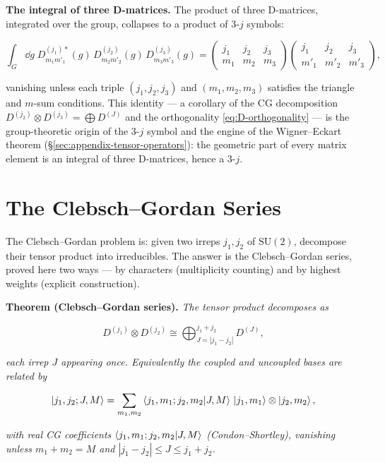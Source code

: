 \medskip\noindent\textbf{The integral of three D-matrices.} The product of three D-matrices, integrated over the group, collapses to a product of 3-$j$ symbols:
\begin{linenomath}
\begin{equation}
\int_{G}\dd g\;D^{(j_{1})*}_{m_{1}m'_{1}}(g)\,D^{(j_{2})}_{m_{2}m'_{2}}(g)\,D^{(j_{3})}_{m_{3}m'_{3}}(g)
=\begin{pmatrix}j_{1}&j_{2}&j_{3}\\ m_{1}&m_{2}&m_{3}\end{pmatrix}\!
\begin{pmatrix}j_{1}&j_{2}&j_{3}\\ m'_{1}&m'_{2}&m'_{3}\end{pmatrix},
\label{eq:three-D-integral}
\end{equation}
\end{linenomath}
vanishing unless each triple $(j_{1},j_{2},j_{3})$ and $(m_{1},m_{2},m_{3})$ satisfies the triangle and $m$-sum conditions. This identity --- a corollary of the CG decomposition $D^{(j_{2})}\otimes D^{(j_{3})}=\bigoplus D^{(J)}$ and the orthogonality \eqref{eq:D-orthogonality} --- is the group-theoretic origin of the 3-$j$ symbol and the engine of the Wigner--Eckart theorem (\S\ref{sec:appendix-tensor-operators}): the geometric part of every matrix element is an integral of three D-matrices, hence a 3-$j$.

\section{The Clebsch--Gordan Series}
\label{sec:appendix-cg}

The Clebsch--Gordan problem is: given two irreps $j_{1},j_{2}$ of $\mathrm{SU}(2)$, decompose their tensor product into irreducibles. The answer is the Clebsch--Gordan series, proved here two ways --- by characters (multiplicity counting) and by highest weights (explicit construction).

\medskip\noindent\textbf{Theorem (Clebsch--Gordan series).} \emph{The tensor product decomposes as}
\begin{linenomath}
\begin{equation}
D^{(j_{1})}\otimes D^{(j_{2})}\cong\bigoplus_{J=|j_{1}-j_{2}|}^{j_{1}+j_{2}}D^{(J)},
\label{eq:app-cg-series}
\end{equation}
\end{linenomath}
\emph{each irrep $J$ appearing once. Equivalently the coupled and uncoupled bases are related by}
\begin{linenomath}
\begin{equation}
\ket{j_{1},j_{2};J,M}=\sum_{m_{1},m_{2}}\braket{j_{1},m_{1};j_{2},m_{2}|J,M}\,\ket{j_{1},m_{1}}\otimes\ket{j_{2},m_{2}},
\label{eq:cg-expansion}
\end{equation}
\end{linenomath}
\emph{with real CG coefficients $\braket{j_{1},m_{1};j_{2},m_{2}|J,M}$ (Condon--Shortley), vanishing unless $m_{1}+m_{2}=M$ and $|j_{1}-j_{2}|\le J\le j_{1}+j_{2}$.}

